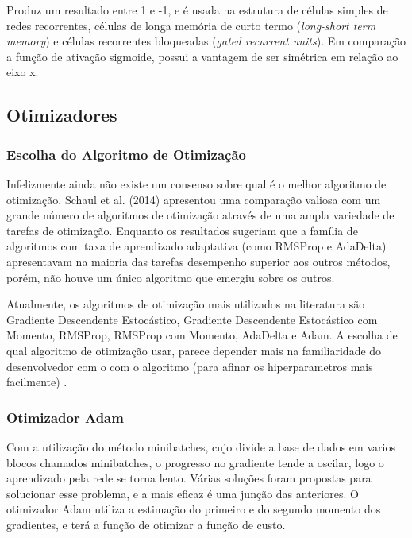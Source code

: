 \documentclass[12pt]{article}
\begin{document}
Produz um resultado entre 1 e -1, e é usada na estrutura de células simples de redes recorrentes, células de longa memória de curto termo (\textit{long-short term memory}) e células recorrentes bloqueadas (\textit{gated recurrent units}). Em comparação a função de ativação sigmoide, possui a vantagem de ser simétrica em relação ao eixo x.

\subsection{Otimizadores}

\subsubsection{Escolha do Algoritmo de Otimização}

Infelizmente ainda não existe um consenso sobre qual é o melhor algoritmo de otimização. Schaul et al. (2014) apresentou uma comparação valiosa com um grande número de algoritmos de otimização através de uma ampla variedade de tarefas de otimização. Enquanto os resultados sugeriam que a família de algoritmos com taxa de aprendizado adaptativa (como RMSProp e AdaDelta) apresentavam na maioria das tarefas desempenho superior aos outros métodos, porém, não houve um único algoritmo que emergiu sobre os outros.

Atualmente, os algoritmos de otimização mais utilizados na literatura são Gradiente Descendente Estocástico, Gradiente Descendente Estocástico com Momento, RMSProp, RMSProp com Momento, AdaDelta e Adam. A escolha de qual algoritmo de otimização usar, parece depender mais na familiaridade do desenvolvedor com o com o algoritmo (para afinar os hiperparametros mais facilmente) \cite{Goodfellow-et-al-2016}.

\subsubsection{Otimizador Adam}

Com a utilização do método minibatches, cujo divide a base de dados em varios blocos chamados minibatches, o progresso no gradiente tende a oscilar, logo o aprendizado pela rede se torna lento. Várias soluções foram propostas para solucionar esse problema, e a mais eficaz é uma junção das anteriores. O otimizador Adam \cite{DBLP:journals/corr/KingmaB14} utiliza a estimação do primeiro e do segundo momento dos gradientes, e terá a função de otimizar a função de custo.
\end{document}
